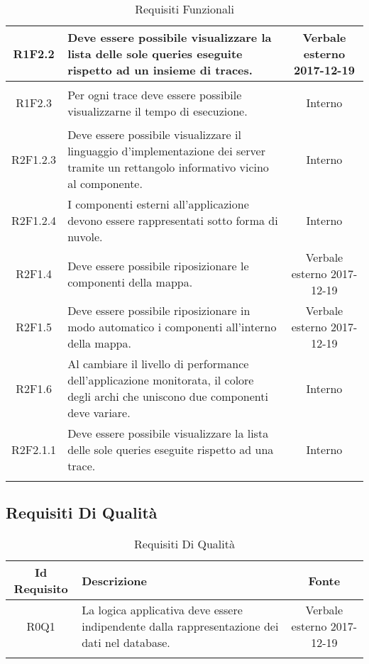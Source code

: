 \begin{longtable}{|c|H|c|}
\hypertarget{R1F2.2}{R1F2.2} & Deve essere possibile visualizzare la lista delle sole queries eseguite rispetto ad un insieme di traces. & Verbale esterno 2017-12-19 \\ \hline 
\hypertarget{R1F2.3}{R1F2.3} & Per ogni trace deve essere possibile visualizzarne il tempo di esecuzione. & Interno \\ \hline 
\hypertarget{R2F1.2.3}{R2F1.2.3} & Deve essere possibile visualizzare il linguaggio d'implementazione dei server tramite un rettangolo informativo vicino al componente. & Interno \\ \hline 
\hypertarget{R2F1.2.4}{R2F1.2.4} & I componenti esterni all'applicazione devono essere rappresentati sotto forma di nuvole. & Interno \\ \hline 
\hypertarget{R2F1.4}{R2F1.4} & Deve essere possibile riposizionare le componenti della mappa. & Verbale esterno 2017-12-19 \\ \hline 
\hypertarget{R2F1.5}{R2F1.5} & Deve essere possibile riposizionare in modo automatico i componenti all'interno della mappa. & Verbale esterno 2017-12-19 \\ \hline 
\hypertarget{R2F1.6}{R2F1.6} & Al cambiare il livello di performance dell'applicazione monitorata, il colore degli archi che uniscono due componenti deve variare. & Interno \\ \hline 
\hypertarget{R2F2.1.1}{R2F2.1.1} & Deve essere possibile visualizzare la lista delle sole queries eseguite rispetto ad una trace. & Interno \\ \hline 
\caption[Requisiti Funzionali]{Requisiti Funzionali}
\label{tabella:req0}
\end{longtable}
\clearpage
\subsection{Requisiti Di Qualità}
\normalsize
\begin{longtable}{|c|H|c|}
\hline
\textbf{Id Requisito} & \textbf{Descrizione} & \textbf{Fonte}\\
\hline
\endhead
\hypertarget{R0Q1}{R0Q1} & La logica applicativa deve essere indipendente dalla rappresentazione dei dati nel database. & Verbale esterno 2017-12-19 \\ \hline 
\caption[Requisiti Di Qualità]{Requisiti Di Qualità}
\label{tabella:req1}
\end{longtable}
\clearpage
